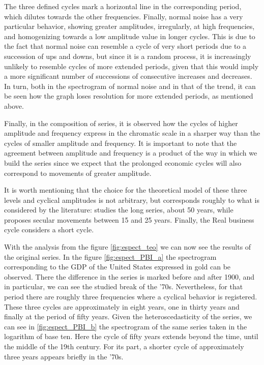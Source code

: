 \documentclass[a4paper,10cpi]{article}
\begin{document}
	The three defined cycles mark a horizontal line in the corresponding period, which dilutes towards the other frequencies. Finally, normal noise has a very particular behavior, showing greater amplitudes, irregularly, at high frequencies, and homogenizing towards a low amplitude value in longer cycles. This is due to the fact that normal noise can resemble a cycle of very short periods due to a succession of ups and downs, but since it is a random process, it is increasingly unlikely to resemble cycles of more extended periods, given that this would imply a more significant number of successions of consecutive increases and decreases. In turn, both in the spectrogram of normal noise and in that of the trend, it can be seen how the graph loses resolution for more extended periods, as mentioned above.
	
	
	Finally, in the composition of series, it is observed how the cycles of higher amplitude and frequency express in the chromatic scale in a sharper way than the cycles of smaller amplitude and frequency. It is important to note that the agreement between amplitude and frequency is a product of the way in which we build the series since we expect that the prolonged economic cycles will also correspond to movements of greater amplitude.
	
	It is worth mentioning that the choice for the theoretical model of these three levels and cyclical amplitudes is not arbitrary, but corresponds roughly to what is considered by the literature: \cite{kondratieff1979long} studies the long series, about 50 years, while \cite {kuznets1930secular} proposes secular movements between 15 and 25 years. Finally, the Real business cycle \citep{kydland1982time} considers a short cycle.
	
	With the analysis from the figure \ref{fig:espect_teo} we can now see the results of the original series. In the figure \ref{fig:espect_PBI_a} the spectrogram corresponding to the GDP of the United States expressed in gold can be observed. There the difference in the series is marked before and after 1900, and in particular, we can see the studied break of the '70s. Nevertheless, for that period there are roughly three frequencies where a cyclical behavior is registered. These three cycles are approximately in eight years, one in thirty years and finally at the period of fifty years. Given the heteroscedasticity of the series, we can see in \ref{fig:espect_PBI_b} the spectrogram of the same series taken in the logarithm of base ten. Here the cycle of fifty years extends beyond the time, until the middle of the 19th century. For its part, a shorter cycle of approximately three years appears briefly in the '70s.
	
\end{document}
